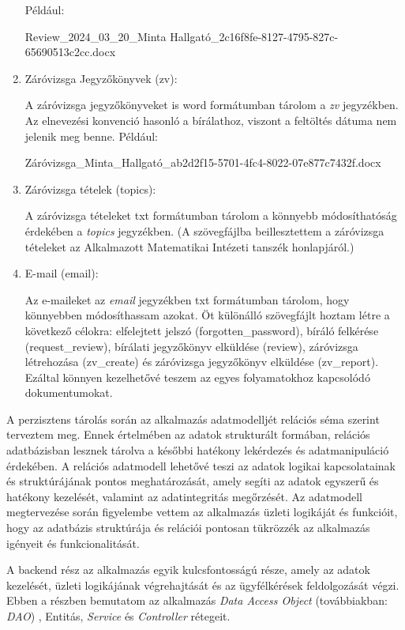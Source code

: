 \begin{enumerate}
\begin{itemize}
\end{itemize}

Például:

Review\_2024\_03\_20\_Minta Hallgató\_2c16f8fe-8127-4795-827c-65690513c2cc.docx


\item{Záróvizsga Jegyzőkönyvek (zv):}

A záróvizsga jegyzőkönyveket is word formátumban tárolom a \textit{zv} jegyzékben. Az elnevezési konvenció hasonló a bírálathoz, viszont a feltöltés dátuma nem jelenik meg benne. Például: 

Záróvizsga\_Minta\_Hallgató\_ab2d2f15-5701-4fc4-8022-07e877c7432f.docx

\item{Záróvizsga tételek (topics):}

A záróvizsga tételeket txt formátumban tárolom a könnyebb módosíthatóság érdekében a \textit{topics} jegyzékben. (A szövegfájlba beillesztettem a záróvizsga tételeket az Alkalmazott Matematikai Intézeti tanszék honlapjáról.)


\item{E-mail (email):}

Az e-maileket az \textit{email} jegyzékben txt formátumban tárolom, hogy könnyebben módosíthassam azokat. Öt különálló szövegfájlt hoztam létre a következő célokra: elfelejtett jelszó (forgotten\_password), bíráló felkérése (request\_review), bírálati jegyzőkönyv elküldése (review), záróvizsga létrehozása (zv\_create) és záróvizsga jegyzőkönyv elküldése (zv\_report). Ezáltal könnyen kezelhetővé teszem az egyes folyamatokhoz kapcsolódó dokumentumokat.

\end{enumerate}

A perzisztens tárolás során az alkalmazás adatmodelljét relációs séma szerint terveztem meg. Ennek értelmében az adatok strukturált formában, relációs adatbázisban lesznek tárolva a későbbi hatékony lekérdezés és adatmanipuláció érdekében. A relációs adatmodell lehetővé teszi az adatok logikai kapcsolatainak és struktúrájának pontos meghatározását, amely segíti az adatok egyszerű és hatékony kezelését, valamint az adatintegritás megőrzését. Az adatmodell megtervezése során figyelembe vettem az alkalmazás üzleti logikáját és funkcióit, hogy az adatbázis struktúrája és relációi pontosan tükrözzék az alkalmazás igényeit és funkcionalitását.


A backend rész az alkalmazás egyik kulcsfontosságú része, amely az adatok kezelését, üzleti logikájának végrehajtását és az ügyfélkérések feldolgozását végzi. Ebben a részben bemutatom az alkalmazás \textit{Data Access Object} (továbbiakban: \textit{DAO}) \cite{DAO}, Entitás, \textit{Service} és \textit{Controller} rétegeit.

